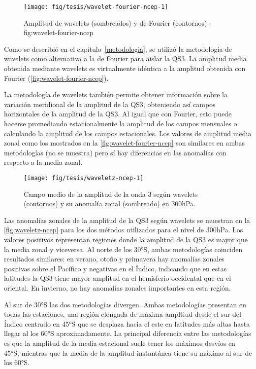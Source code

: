 \documentclass[spanish,a4paper,12p]{book}
\begin{document}
\begin{figure}

{\centering \texttt{[image: fig/tesis/wavelet-fourier-ncep-1]} 

}

\caption{Amplitud de wavelets (sombreados) y de Fourier (contornos) - fig:wavelet-fourier-ncep}\label{fig:wavelet-fourier-ncep}
\end{figure}

Como se describió en el capítulo~\ref{metodologia}, se utilizó la
metodología de wavelets como alternativa a la de Fourier para aislar la
QS3. La amplitud media obtenida mediante wavelets es virtualmente
idéntica a la amplitud obtenida con Fourier
(\autoref{fig:wavelet-fourier-ncep}).

La metodología de wavelets también permite obtener información sobre la
variación meridional de la amplitud de la QS3, obteniendo así campos
horizontales de la amplitud de la QS3. Al igual que con Fourier, esto
puede hacerse promediando estacionalmente la amplitud de los campos
mensuales o calculando la amplitud de los campos estacionales. Los
valores de amplitud media zonal como los mostrados en la
\autoref{fig:wavelet-fourier-ncep} son similares en ambas metodologías
(no se muestra) pero sí hay diferencias en las anomalías con respecto a
la media zonal.

\begin{figure}

{\centering \texttt{[image: fig/tesis/waveletz-ncep-1]} 

}

\caption{Campo medio de la amplitud de la onda 3 según wavelets (contornos) y su anomalía zonal (sombreado) en 300hPa.}\label{fig:waveletz-ncep}
\end{figure}

Las anomalías zonales de la amplitud de la QS3 según wavelets se
muestran en la \autoref{fig:waveletz-ncep} para los dos métodos
utilizados para el nivel de 300hPa. Los valores positivos representan
regiones donde la amplitud de la QS3 es mayor que la media zonal y
viceversa. Al norte de los 30°S, ambas metodologías coinciden resultados
similares: en verano, otoño y primavera hay anomalías zonales positivas
sobre el Pacífico y negativas en el Índico, indicando que en estas
latitudes la QS3 tiene mayor amplitud en el hemisferio occidental que en
el oriental. En invierno, no hay anomalías zonales importantes en esta
región.

Al sur de 30°S las dos metodologías divergen. Ambas metodologías
presentan en todas las estaciones, una región elongada de máxima
ampltiud desde el sur del Índico centrado en 45°S que se desplaza hacia
el este en latitudes más altas hasta llegar al los 60°S aproximadamente.
La principal diferencia entre las metodologías es que la amplitud de la
media estacional suele tener los máximos desvíos en 45°S, mientras que
la media de la amplitud instantánea tiene su máximo al sur de los 60°S.
\end{document}
